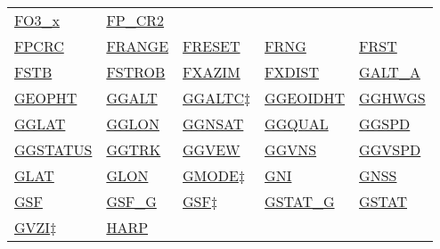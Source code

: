 \documentclass[
  english,
]{book}
\begin{document}
\begin{longtable}[]{@{}lllll@{}}
\href{./air-chemistry-measurements.html\#fo3-acd}{FO3\_x} &
\href{./the-state-of-the-atmosphere.html\#mirror-cr2}{FP\_CR2} \\
\href{./obsolete-variables.html\#cryo-hygro}{FPCRC} &
\href{./cloud-physics-variables.html\#fssp-range}{FRANGE} &
\href{./obsolete-variables.html\#freset}{FRESET} &
\href{./cloud-physics-variables.html\#fssp-range}{FRNG} &
\href{./obsolete-variables.html\#freset}{FRST} \\
\href{./obsolete-variables.html\#fstrob}{FSTB} &
\href{./obsolete-variables.html\#fstrob}{FSTROB} &
\href{./the-state-of-the-aircraft.html\#fxazim}{FXAZIM} &
\href{./the-state-of-the-aircraft.html\#fxazim}{FXDIST} &
\href{./the-state-of-the-aircraft.html\#ggalt}{GALT\_A} \\
\href{./the-state-of-the-aircraft.html\#geopth}{GEOPHT} &
\href{./the-state-of-the-aircraft.html\#ggalt}{GGALT} &
\href{./the-state-of-the-aircraft.html\#altx}{GGALTC\(\ddagger\)} &
\href{./the-state-of-the-aircraft.html\#ggeoidht}{GGEOIDHT} &
\href{./the-state-of-the-aircraft.html\#gghwgs}{GGHWGS} \\
\href{./the-state-of-the-aircraft.html\#gglat}{GGLAT} &
\href{./the-state-of-the-aircraft.html\#gglon}{GGLON} &
\href{./the-state-of-the-aircraft.html\#ggnsat}{GGNSAT} &
\href{./the-state-of-the-aircraft.html\#ggqual}{GGQUAL} &
\href{./the-state-of-the-aircraft.html\#ggspd}{GGSPD} \\
\href{./the-state-of-the-aircraft.html\#ggstatus}{GGSTATUS} &
\href{./the-state-of-the-aircraft.html\#ggtrk}{GGTRK} &
\href{./the-state-of-the-aircraft.html\#ggvew}{GGVEW} &
\href{./the-state-of-the-aircraft.html\#ggvns}{GGVNS} &
\href{./the-state-of-the-aircraft.html\#ggvspd}{GGVSPD} \\
\href{./the-state-of-the-aircraft.html\#gglat}{GLAT} &
\href{./the-state-of-the-aircraft.html\#gglon}{GLON} &
\href{./the-state-of-the-aircraft.html\#gmode}{GMODE\(\ddagger\)} &
\href{./aerosol-particle-measurements.html\#special-aerosol}{GNI} &
\href{./the-state-of-the-atmosphere.html\#special-use-remote}{GNSS} \\
\href{./the-state-of-the-aircraft.html\#gsf}{GSF} &
\href{./the-state-of-the-aircraft.html\#ggspd}{GSF\_G} &
\href{./obsolete-variables.html\#gsf-obsolete}{GSF\(\ddagger\)} &
\href{./the-state-of-the-aircraft.html\#ggstatus}{GSTAT\_G} &
\href{./the-state-of-the-aircraft.html\#ggstatus}{GSTAT} \\
\href{./the-state-of-the-aircraft.html\#ggvspd}{GVZI\(\ddagger\)} &
\href{./radiation-variables.html\#harp}{HARP} &

\end{longtable}
\end{document}
